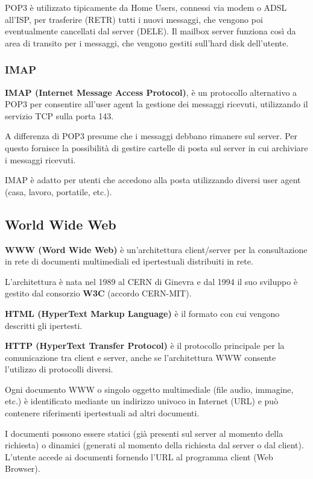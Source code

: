             POP3 è utilizzato tipicamente da Home Users, connessi via modem o ADSL all'ISP, per trasferire (RETR) tutti i nuovi messaggi, che vengono poi eventualmente cancellati dal server (DELE). Il mailbox server funziona così da area di transito per i messaggi, che vengono gestiti sull'hard disk dell'utente.

        \subsubsection{IMAP}
            \textbf{IMAP (Internet Message Access Protocol)}, è un protocollo alternativo a POP3 per consentire all'user agent la gestione dei messaggi ricevuti, utilizzando il servizio TCP sulla porta 143.
        
            A differenza di POP3 presume che i messaggi debbano rimanere sul server. Per questo fornisce la possibilità di gestire cartelle di posta sul server in cui archiviare i messaggi ricevuti.
        
            IMAP è adatto per utenti che accedono alla posta utilizzando diversi user agent (casa, lavoro, portatile, etc.).

    \subsection{World Wide Web}
        \textbf{WWW (Word Wide Web)} è un'architettura client/server per la consultazione in rete di documenti multimediali ed ipertestuali distribuiti in rete.

        L'architettura è nata nel 1989 al CERN di Ginevra e dal 1994 il suo sviluppo è gestito dal consorzio \textbf{W3C} (accordo CERN-MIT).

        \textbf{HTML (HyperText Markup Language)} è il formato con cui vengono descritti gli ipertesti.

        \textbf{HTTP (HyperText Transfer Protocol)} è il protocollo principale per la comunicazione tra client e server, anche se l'architettura WWW consente l'utilizzo di protocolli diversi.

        Ogni documento WWW o singolo oggetto multimediale (file audio, immagine, etc.) è identificato mediante un indirizzo univoco in Internet (URL) e può contenere riferimenti ipertestuali ad altri documenti.

        I documenti possono essere statici (già presenti sul server al momento della richiesta) o dinamici (generati al momento della richiesta dal server o dal client). L'utente accede ai documenti fornendo l'URL al programma client (Web Browser).

